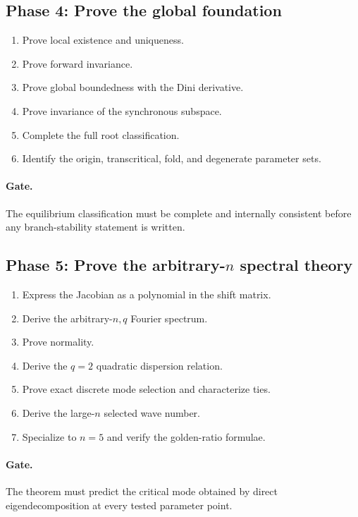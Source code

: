 \documentclass[11pt, reqno]{amsart}
\theoremstyle{definition}
\theoremstyle{remark}
\begin{document}
\subsection{Phase 4: Prove the global foundation}

\begin{enumerate}[label=4.\arabic*,leftmargin=3em]
    \item Prove local existence and uniqueness.
    \item Prove forward invariance.
    \item Prove global boundedness with the Dini derivative.
    \item Prove invariance of the synchronous subspace.
    \item Complete the full root classification.
    \item Identify the origin, transcritical, fold, and degenerate parameter
    sets.
\end{enumerate}

\paragraph{Gate.}
The equilibrium classification must be complete and internally consistent
before any branch-stability statement is written.

\subsection{Phase 5: Prove the arbitrary-$n$ spectral theory}

\begin{enumerate}[label=5.\arabic*,leftmargin=3em]
    \item Express the Jacobian as a polynomial in the shift matrix.
    \item Derive the arbitrary-$n,q$ Fourier spectrum.
    \item Prove normality.
    \item Derive the $q=2$ quadratic dispersion relation.
    \item Prove exact discrete mode selection and characterize ties.
    \item Derive the large-$n$ selected wave number.
    \item Specialize to $n=5$ and verify the golden-ratio formulae.
\end{enumerate}

\paragraph{Gate.}
The theorem must predict the critical mode obtained by direct eigendecomposition
at every tested parameter point.
\end{document}
